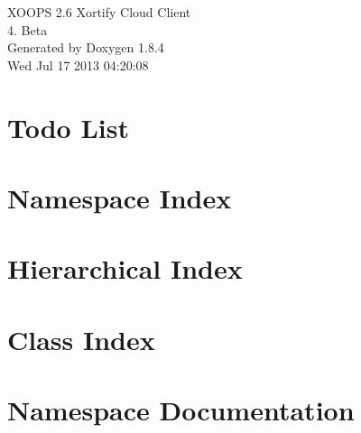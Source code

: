 \documentclass[twoside]{book}
\newcommand{\clearemptydoublepage}{%
  \newpage{\pagestyle{empty}\cleardoublepage}%
}
\begin{document}
\hypersetup{pageanchor=false}
\begin{titlepage}
\vspace*{7cm}
\begin{center}%
{\Large X\-O\-O\-P\-S 2.6 Xortify Cloud Client \\[1ex]\large 4. Beta }\\
\vspace*{1cm}
{\large Generated by Doxygen 1.8.4}\\
\vspace*{0.5cm}
{\small Wed Jul 17 2013 04:20:08}\\
\end{center}
\end{titlepage}
\clearemptydoublepage
\tableofcontents
\clearemptydoublepage
{}
\hypersetup{pageanchor=true}

\chapter{Todo List}
\label{todo}
\hypertarget{todo}{}

\chapter{Namespace Index}

\chapter{Hierarchical Index}

\chapter{Class Index}

\chapter{Namespace Documentation}







\end{document}
